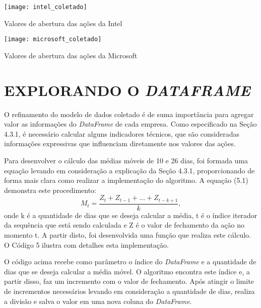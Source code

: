 \begin{grafico}[h]
	\centering
	\centerline{\texttt{[image: intel\_coletado]}}
	\caption{Valores de abertura das ações da Intel}
	\label{exec-intel-coleta}
\end{grafico}

\begin{grafico}[h]
	\centering
	\centerline{\texttt{[image: microsoft\_coletado]}}
	\caption{Valores de abertura das ações da Microsoft}
	\label{exec-microsoft-coleta}
\end{grafico}

\clearpage
\section{EXPLORANDO O \textit{DATAFRAME}}
O refinamento do modelo de dados coletado é de suma importância para agregar valor as informações do \textit{DataFrame} de cada empresa. Como especificado na Seção 4.3.1, é necessário calcular alguns indicadores técnicos, que são consideradas informações expressivas que influenciam diretamente nos valores das ações.

Para desenvolver o cálculo das médias móveis de 10 e 26 dias, foi formada uma equação levando em consideração a explicação da Seção 4.3.1, proporcionando de forma mais clara como realizar a implementação do algoritmo. A equação (5.1) demonstra este procedimento:
\begin{equation}\label{eq:MMS}
M_t = \dfrac{Z_t + Z_{t-1} + \dots + Z_{t-k+1}}{k},
\end{equation}
onde k é a quantidade de dias que se deseja calcular a média, t é o índice iterador da sequência que está sendo calculada e Z é o valor de fechamento da ação no momento t. A partir disto, foi desenvolvida uma função que realiza este cálculo. O Código 5 ilustra com detalhes esta implementação. 


O código acima recebe como parâmetro o índice do \textit{DataFrame} e a quantidade de dias que se deseja calcular a média móvel. O algoritmo encontra este índice e, a partir disso, faz um incremento com o valor de fechamento. Após atingir o limite de incrementos necessários levando em consideração a quantidade de dias, realiza a divisão e salva o valor em uma nova coluna do \textit{DataFrame}.

